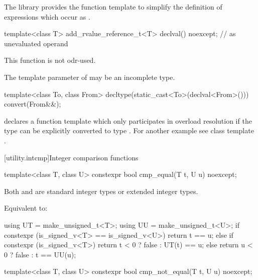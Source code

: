 \pnum
The library provides the function template  to simplify the definition of
expressions which occur as .

%
\begin{itemdecl}
template<class T> add_rvalue_reference_t<T> declval() noexcept;    // as unevaluated operand
\end{itemdecl}

\begin{itemdescr}
\pnum
\mandates
This function is not odr-used.

\pnum
\remarks
The template parameter  of  may be an incomplete type.

\pnum
\begin{example}
\begin{codeblock}
template<class To, class From> decltype(static_cast<To>(declval<From>())) convert(From&&);
\end{codeblock}
declares a function template  which only participates in overload resolution if the
type  can be explicitly converted to type . For another example see class
template .
\end{example}
\end{itemdescr}

[utility.intcmp]{Integer comparison functions}

%
\begin{itemdecl}
template<class T, class U>
  constexpr bool cmp_equal(T t, U u) noexcept;
\end{itemdecl}

\begin{itemdescr}
\pnum
\mandates
Both  and  are standard integer types or
extended integer types.

\pnum
\effects
Equivalent to:
\begin{codeblock}
using UT = make_unsigned_t<T>;
using UU = make_unsigned_t<U>;
if constexpr (is_signed_v<T> == is_signed_v<U>)
  return t == u;
else if constexpr (is_signed_v<T>)
  return t < 0 ? false : UT(t) == u;
else
  return u < 0 ? false : t == UU(u);
\end{codeblock}
\end{itemdescr}

%
\begin{itemdecl}
template<class T, class U>
  constexpr bool cmp_not_equal(T t, U u) noexcept;
\end{itemdecl}

